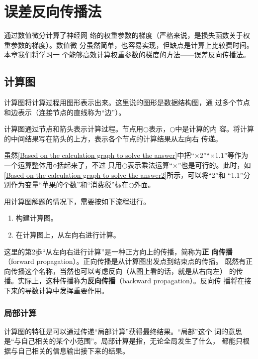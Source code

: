 \chapter{误差反向传播法}
通过数值微分计算了神经网
络的权重参数的梯度（严格来说，是损失函数关于权重参数的梯度）。数值微
分虽然简单，也容易实现，但缺点是计算上比较费时间。本章我们将学习一
个能够高效计算权重参数的梯度的方法——误差反向传播法。
\section{计算图}
计算图将计算过程用图形表示出来。这里说的图形是数据结构图，通
过多个节点和边表示（连接节点的直线称为“边”）。

计算图通过节点和箭头表示计算过程。节点用$\bigcirc$表示，$\bigcirc$中是计算的内
容。将计算的中间结果写在箭头的上方，表示各个节点的计算结果从左向右
传递。


虽然\autoref{Based on the calculation graph to solve the answer}中把“$\times 2$”“$\times 1.1$”等作为一个运算整体用○括起来了，不过
只用$\bigcirc$表示乘法运算“$\times$”也是可行的。此时，如\autoref{Based on the calculation graph to solve the answer2}所示，可以将“2”和
“1.1”分别作为变量“苹果的个数”和“消费税”标在$\bigcirc$外面。


用计算图解题的情况下，需要按如下流程进行。
\begin{enumerate}
    \item 构建计算图。
    \item 在计算图上，从左向右进行计算。
\end{enumerate}

这里的第2歩“从左向右进行计算”是一种正方向上的传播，简称为\textbf{正
    向传播}（forward propagation）。正向传播是从计算图出发点到结束点的传播。
既然有正向传播这个名称，当然也可以考虑反向（从图上看的话，就是从右向左）
的传播。实际上，这种传播称为\textbf{反向传播}（backward propagation）。反向传
播将在接下来的导数计算中发挥重要作用。

\subsection{局部计算}
计算图的特征是可以通过传递“局部计算”获得最终结果。“局部”这个
词的意思是“与自己相关的某个小范围”。局部计算是指，无论全局发生了什么，
都能只根据与自己相关的信息输出接下来的结果。
